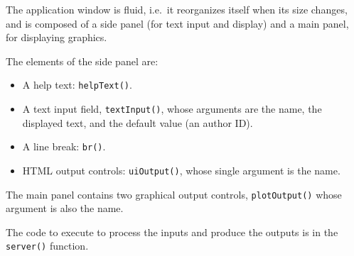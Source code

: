 \documentclass[
  12pt,
  american,
  a4paper,
  extrafontsizes,onecolumn,openright
  ]{memoir}
\providecommand{\tightlist}{%
  \setlength{\itemsep}{0pt}\setlength{\parskip}{0pt}}
\begin{document}
\normalsize

The application window is fluid, i.e.~it reorganizes itself when its size changes, and is composed of a side panel (for text input and display) and a main panel, for displaying graphics.

The elements of the side panel are:

\begin{itemize}
\tightlist
\item
  A help text: \texttt{helpText()}.
\item
  A text input field, \texttt{textInput()}, whose arguments are the name, the displayed text, and the default value (an author ID).
\item
  A line break: \texttt{br()}.
\item
  HTML output controls: \texttt{uiOutput()}, whose single argument is the name.
\end{itemize}

The main panel contains two graphical output controls, \texttt{plotOutput()} whose argument is also the name.

The code to execute to process the inputs and produce the outputs is in the \texttt{server()} function.

\scriptsize
\end{document}
